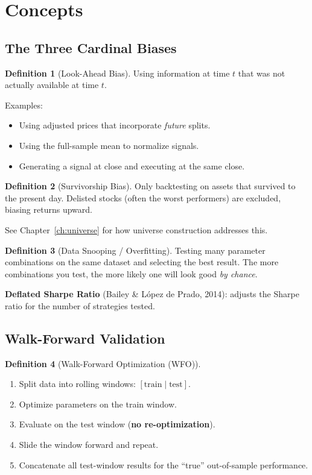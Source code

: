 \documentclass[a4paper, 11pt]{report}
\theoremstyle{definition}
\newtheorem{definition}{Definition}[chapter]
\theoremstyle{remark}
\begin{document}
\section{Concepts}

\subsection{The Three Cardinal Biases}

\begin{definition}[Look-Ahead Bias]
    Using information at time $t$ that was not actually available at time $t$.

    Examples:
    \begin{itemize}
        \item Using adjusted prices that incorporate \emph{future} splits.
        \item Using the full-sample mean to normalize signals.
        \item Generating a signal at close and executing at the same close.
    \end{itemize}
\end{definition}

\begin{definition}[Survivorship Bias]
    Only backtesting on assets that survived to the present day.  Delisted
    stocks (often the worst performers) are excluded, biasing returns upward.

    See Chapter~\ref{ch:universe} for how universe construction addresses this.
\end{definition}

\begin{definition}[Data Snooping / Overfitting]
    Testing many parameter combinations on the same dataset and selecting the
    best result.  The more combinations you test, the more likely one will
    look good \emph{by chance}.

    \textbf{Deflated Sharpe Ratio} (Bailey \& L\'{o}pez de Prado, 2014):
    adjusts the Sharpe ratio for the number of strategies tested.
\end{definition}

\subsection{Walk-Forward Validation}

\begin{definition}[Walk-Forward Optimization (WFO)]
    \begin{enumerate}
        \item Split data into rolling windows: $[\text{train} \mid \text{test}]$.
        \item Optimize parameters on the train window.
        \item Evaluate on the test window (\textbf{no re-optimization}).
        \item Slide the window forward and repeat.
        \item Concatenate all test-window results for the ``true'' out-of-sample
              performance.
    \end{enumerate}
\end{definition}
\end{document}
